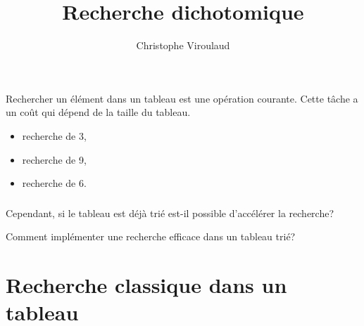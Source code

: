 \documentclass[svgnames,11pt]{beamer}
\author[]{Christophe Viroulaud}
\title{Recherche dichotomique}
\date{\framebox{\textbf{Algo 03}}}
\institute{Première - NSI}
\begin{document}
\begin{frame}
\titlepage
\end{frame}

\begin{frame}
    Rechercher un élément dans un tableau est une opération courante. Cette tâche a un coût qui dépend de la taille du tableau.
   

    \begin{center}
    \end{center}
\begin{itemize}
    \item recherche de 3,
    \item recherche de 9,
    \item recherche de 6.
\end{itemize}
\end{frame}
\begin{frame}
    \frametitle{}
    Cependant, si le tableau est déjà trié est-il possible d'accélérer la recherche?
    \begin{center}
    \end{center}
    \begin{framed}
        \centering Comment implémenter une recherche efficace dans un tableau trié?
   \end{framed}

\end{frame}
\section{Recherche classique dans un tableau}
\end{document}
